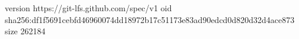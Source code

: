 version https://git-lfs.github.com/spec/v1
oid sha256:df1f5691cebfd46960074dd18972b17c51173e83ad90edcd0d820d32d4ace873
size 262184
